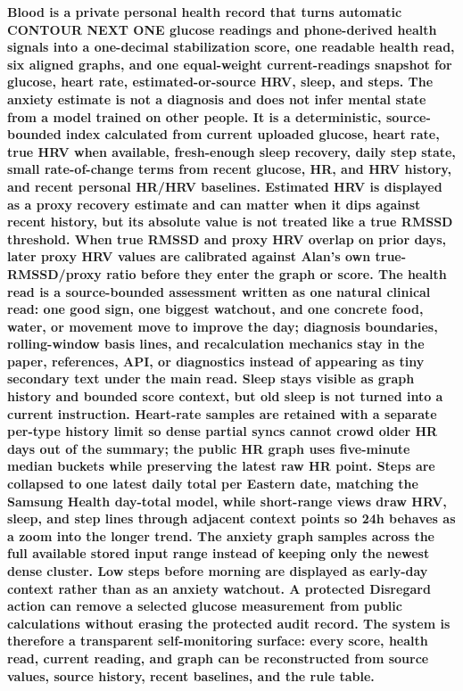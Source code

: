 \documentclass[12pt,letterpaper]{article}
\begin{document}
\vspace{0.35em}
\noindent\textbf{Blood is a private personal health record that turns automatic CONTOUR NEXT ONE glucose readings and phone-derived health signals into a one-decimal stabilization score, one readable health read, six aligned graphs, and one equal-weight current-readings snapshot for glucose, heart rate, estimated-or-source HRV, sleep, and steps. The anxiety estimate is not a diagnosis and does not infer mental state from a model trained on other people. It is a deterministic, source-bounded index calculated from current uploaded glucose, heart rate, true HRV when available, fresh-enough sleep recovery, daily step state, small rate-of-change terms from recent glucose, HR, and HRV history, and recent personal HR/HRV baselines. Estimated HRV is displayed as a proxy recovery estimate and can matter when it dips against recent history, but its absolute value is not treated like a true RMSSD threshold. When true RMSSD and proxy HRV overlap on prior days, later proxy HRV values are calibrated against Alan's own true-RMSSD/proxy ratio before they enter the graph or score. The health read is a source-bounded assessment written as one natural clinical read: one good sign, one biggest watchout, and one concrete food, water, or movement move to improve the day; diagnosis boundaries, rolling-window basis lines, and recalculation mechanics stay in the paper, references, API, or diagnostics instead of appearing as tiny secondary text under the main read. Sleep stays visible as graph history and bounded score context, but old sleep is not turned into a current instruction. Heart-rate samples are retained with a separate per-type history limit so dense partial syncs cannot crowd older HR days out of the summary; the public HR graph uses five-minute median buckets while preserving the latest raw HR point. Steps are collapsed to one latest daily total per Eastern date, matching the Samsung Health day-total model, while short-range views draw HRV, sleep, and step lines through adjacent context points so 24h behaves as a zoom into the longer trend. The anxiety graph samples across the full available stored input range instead of keeping only the newest dense cluster. Low steps before morning are displayed as early-day context rather than as an anxiety watchout. A protected Disregard action can remove a selected glucose measurement from public calculations without erasing the protected audit record. The system is therefore a transparent self-monitoring surface: every score, health read, current reading, and graph can be reconstructed from source values, source history, recent baselines, and the rule table.}
\end{document}
